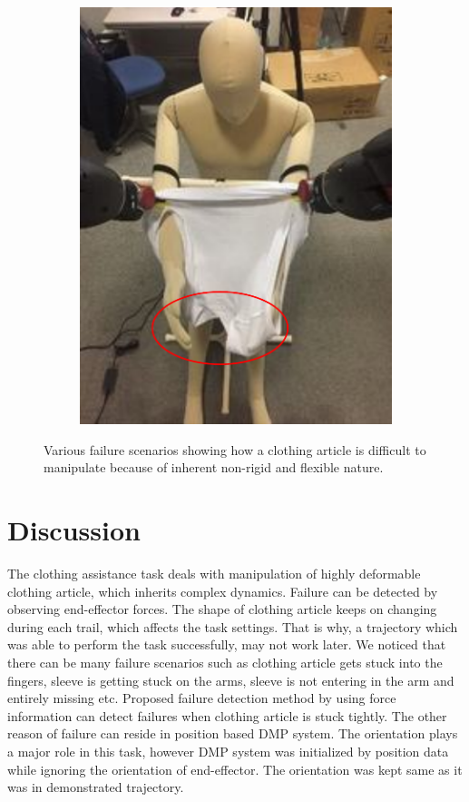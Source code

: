 \documentclass[sigconf]{acmart}
\begin{document}
\begin{figure}
\begin{subfigure}{.4\linewidth}
		\includegraphics[width=.98\linewidth]{failure_scenario_4}
	\end{subfigure}
	\caption{Various failure scenarios showing how a clothing article is difficult to manipulate because of inherent non-rigid and flexible nature.}
	\label{fig:failure_scenarios}
\end{figure}

\section{Discussion}
\label{sec:discussion}
The clothing assistance task deals with manipulation of highly deformable clothing article, which inherits complex dynamics. Failure can be detected by observing end-effector forces. The shape of clothing article keeps on changing during each trail, which affects the task settings. That is why, a trajectory which was able to perform the task successfully, may not work later. We noticed that there can be many failure scenarios such as clothing article gets stuck into the fingers, sleeve is getting stuck on the arms, sleeve is not entering in the arm and entirely missing etc. Proposed failure detection method by using force information can detect failures when clothing article is stuck tightly. The other reason of failure can reside in position based DMP system. The orientation plays a major role in this task, however DMP system was initialized by position data while ignoring the orientation of end-effector. The orientation was kept same as it was in demonstrated trajectory.
\end{document}
